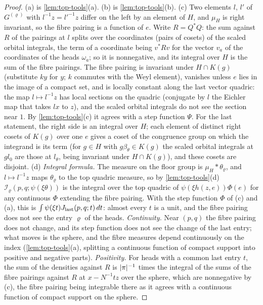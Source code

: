 \begin{proof}
(a) is \cref{lem:top-tools}(a). (b) is \cref{lem:top-tools}(b). (c) Two elements $l$, $l'$ of $G^{(\varrho)}$ with $l^{-1}z=l'^{-1}z$ differ on the left by an element of $H$, and $\mu_H$ is right invariant, so the fibre pairing is a function of $e$. Write $R=Q^*Q$: the sum
against $R$ of the pairings at $l$ splits over the coordinates (pairs of cosets) of the scaled orbital integrals, the term of a coordinate being $v^*Rv$ for the vector $v_a$ of the coordinates of the heads $\omega_a$; so it is nonnegative, and its integral
over $H$ is the sum of the fibre pairings. The fibre pairing is invariant under $H\cap K(g)$ (substitute $ky$ for $y$; $k$ commutes with the Weyl element), vanishes unless $e$ lies in the image of a compact set, and is locally constant along the last
vector quadric: the map $l\mapsto l^{-1}z$ has local sections on the quadric (conjugate by $l$ the Eichler map that takes $lx$ to $z$), and the scaled orbital integrals do not see the section near $1$. By \cref{lem:top-tools}(c) it agrees with a step
function $\Psi$. For the last statement, the right side is an integral over $H$; each element of distinct right cosets of $K(g)$ over one $e$ gives a coset of the congruence group on which the integrand is its term (for $g\in H$ with $g\beta_\theta\in K(g)$
the scaled orbital integrals at $gl_0$ are those at $l_\theta$, being invariant under $H\cap K(g)$), and these cosets are disjoint.
(d) \emph{Integral formula.} The measure on the floor group is $\mu_H*\theta_\varrho$, and $l\mapsto l^{-1}z$ maps $\theta_\varrho$ to the top quadric measure, so by \cref{lem:top-tools}(d) $\mathcal I_\varrho(p,q;\psi(\xi\theta))$ is the integral over the top quadric of
$\psi(\xi h(z,e))\Phi(e)$ for any continuous $\Phi$ extending the fibre pairing. With the step function $\Phi$ of (c) and (a), this is $\int\psi(\xi t)J_{\rm last}(p,q;t)\,dt$: almost every $t$ is a unit, and the fibre pairing does not see the entry
$\varrho$ of the heads. \emph{Continuity.} Near $(p,q)$ the fibre pairing does not change, and its step function does not see the change of the last entry; what moves is the sphere, and the fibre measures depend continuously on the index
(\cref{lem:top-tools}(a), splitting a continuous function of compact support into positive and negative parts). \emph{Positivity.} For heads with a common last entry $t$, the sum of the densities against $R$ is $\lvert \pi\rvert^{-1}$ times the integral of the
sums of the fibre pairings against $R$ at $x-N^{-1}tz$ over the sphere, which are nonnegative by (c), the fibre pairing being integrable there as it agrees with a continuous function of compact support on the sphere.
\end{proof}
